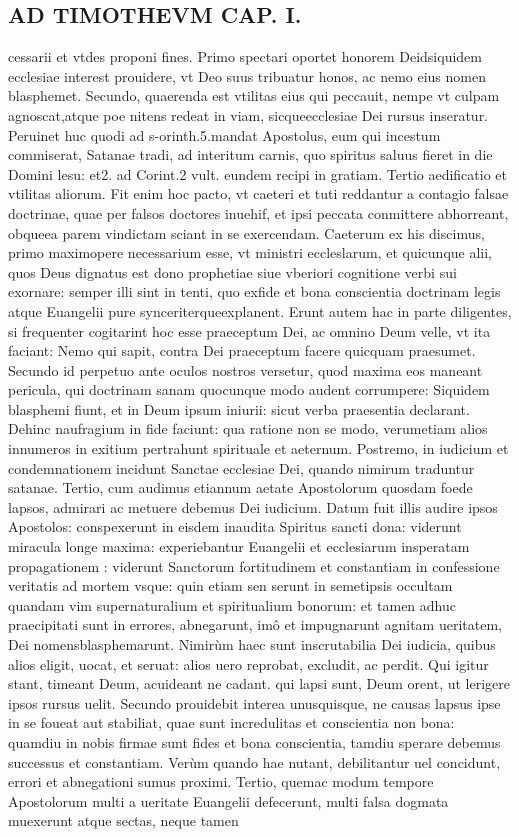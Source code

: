 \documentclass{article}
\begin{document}
\begin{pages}
\section*{AD TIMOTHEVM CAP. I. }
\marginpar{[ p.61 ]}\pstart cessarii et vtdes proponi fines. Primo spectari oportet honorem Deidsiquidem ecclesiae interest prouidere, vt Deo suus tribuatur honos, ac nemo eius nomen blasphemet. Secundo, quaerenda est vtilitas eius qui peccauit, nempe vt culpam agnoscat,atque  poe nitens redeat in viam, sicqueecclesiae Dei rursus inseratur. Peruinet huc quodi ad s-orinth.5.mandat Apostolus, eum qui incestum commiserat, Satanae tradi, ad interitum carnis, quo spiritus saluus fieret in die Domini lesu: et2. ad Corint.2 vult. eundem recipi in gratiam. Tertio aedificatio et vtilitas aliorum. Fit enim hoc pacto, vt caeteri et tuti reddantur a contagio falsae doctrinae, quae per falsos doctores inuehif, et ipsi peccata conmittere abhorreant, obqueea parem vindictam sciant in se exercendam. Caeterum ex his discimus, primo maximopere necessarium esse, vt ministri eccleslarum, et quicunque alii, quos Deus dignatus est dono prophetiae siue vberiori cognitione verbi sui exornare: semper illi sint in tenti, quo exfide et bona conscientia doctrinam legis atque Euangelii pure synceriterqueexplanent. Erunt autem hac in parte diligentes, si frequenter cogitarint hoc esse praeceptum Dei, ac omnino Deum velle, vt ita faciant: Nemo qui sapit, contra Dei praeceptum facere quicquam praesumet. Secundo id perpetuo ante oculos nostros versetur, quod maxima eos maneant pericula, qui doctrinam sanam quocunque  modo audent corrumpere: Siquidem blasphemi fiunt, et in Deum ipsum iniurii: sicut verba praesentia declarant. Dehinc naufragium in fide faciunt: qua ratione non se modo, verumetiam alios innumeros in exitium pertrahunt spirituale et aeternum. Postremo, in iudicium et condemnationem incidunt Sanctae ecclesiae Dei, quando nimirum traduntur satanae. Tertio, cum audimus etiannum aetate Apostolorum quosdam foede lapsos, admirari ac metuere debemus Dei iudicium. Datum fuit illis audire ipsos Apostolos: conspexerunt in eisdem inaudita Spiritus sancti dona: viderunt miracula longe maxima: experiebantur Euangelii et ecclesiarum insperatam propagationem : viderunt Sanctorum fortitudinem et constantiam in confessione veritatis ad mortem vsque: quin etiam sen serunt in semetipsis occultam quandam vim supernaturalium et spiritualium bonorum: et tamen adhuc praecipitati sunt in errores, abnegarunt, imô et impugnarunt agnitam ueritatem, Dei nomensblasphemarunt. Nimirùm haec sunt inscrutabilia Dei iudicia, quibus alios eligit, uocat, et seruat: alios uero reprobat, excludit, ac perdit. Qui igitur stant, timeant Deum, acuideant ne cadant. qui lapsi sunt, Deum orent, ut lerigere ipsos rursus uelit. Secundo prouidebit interea unusquisque, ne causas lapsus ipse in se foueat aut stabiliat, quae sunt incredulitas et conscientia non bona: quamdiu in nobis firmae sunt fides et bona conscientia, tamdiu sperare debemus successus et constantiam. Verùm quando hae nutant, debilitantur uel concidunt, errori et abnegationi sumus proximi. Tertio, quemac modum tempore Apostolorum multi a ueritate Euangelii defecerunt, multi falsa dogmata muexerunt atque  sectas, neque  tamen 
\end{pages}
\end{document}
